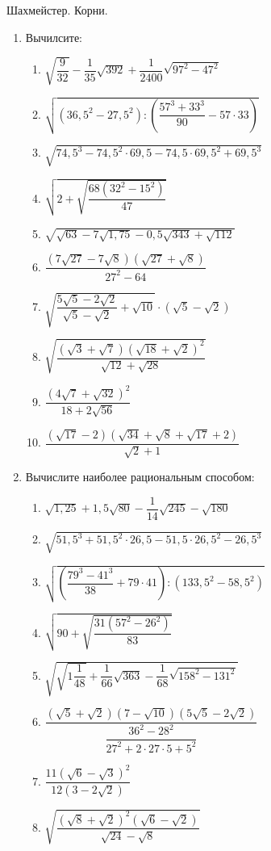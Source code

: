 \documentclass[12pt, a4paper]{article}
\begin{document}
	
	Шахмейстер. Корни.
\begin{enumerate}
	\item Вычилсите:
		\begin{enumerate}[label=\textbf{\arabic*)}]
			\item \( \sqrt{\dfrac{9}{32}}-\dfrac{1}{35}\sqrt{392}+\dfrac{1}{2400}\sqrt{97^2-47^2} \)
			\item \( \sqrt{(36,5^2-27,5^2):\left( \dfrac{57^3+33^3}{90}-57\cdot33 \right)} \) 
			\item \( \sqrt{74,5^3-74,5^2\cdot69,5-74,5\cdot69,5^2+69,5^3} \)
			\item \( \sqrt{2+\sqrt{\dfrac{68(32^2-15^2)}{47}}} \)
			\item \( \sqrt{\sqrt{63}-7\sqrt{1,75}-0,5\sqrt{343}+\sqrt{112}} \)
			\item \( \dfrac{(7\sqrt{27}-7\sqrt{8})(\sqrt{27}+\sqrt{8})}{27^2-64} \)
			\item \( \sqrt{\dfrac{5\sqrt{5}-2\sqrt{2}}{\sqrt{5}-\sqrt{2}}+\sqrt{10}}\cdot(\sqrt{5}-\sqrt{2}) \)
			\item \( \sqrt{\dfrac{(\sqrt{3}+\sqrt{7})(\sqrt{18}+\sqrt{2})^2}{\sqrt{12}+\sqrt{28}}} \)
			\item \( \dfrac{(4\sqrt{7}+\sqrt{32})^2}{18+2\sqrt{56}} \)
			\item \( \dfrac{(\sqrt{17}-2)(\sqrt{34}+\sqrt{8}+\sqrt{17}+2)}{\sqrt{2}+1} \)
		\end{enumerate}
	\item Вычислите наиболее рациональным способом:
		\begin{enumerate}[label=\textbf{\arabic*)}]
			\item \( \sqrt{1,25}+1,5\sqrt{80}-\dfrac{1}{14}\sqrt{245}-\sqrt{180} \)
			\item \( \sqrt{51,5^3+51,5^2\cdot26,5-51,5\cdot26,5^2-26,5^3} \)
			\item \( \sqrt{\left( \dfrac{79^3-41^3}{38}+79\cdot41 \right):(133,5^2-58,5^2)} \)
			\item \( \sqrt{90+\sqrt{\dfrac{31(57^2-26^2)}{83}}} \)
			\item \( \sqrt{\sqrt{1\dfrac{1}{48}}+\dfrac{1}{66}\sqrt{363}-\dfrac{1}{68}\sqrt{158^2-131^2}} \)
			\item \( \dfrac{(\sqrt{5}+\sqrt{2})(7-\sqrt{10})(5\sqrt{5}-2\sqrt{2})}{\dfrac{36^2-28^2}{27^2+2\cdot27\cdot5+5^2}} \)
			\item \( \dfrac{11(\sqrt{6}-\sqrt{3})^2}{12(3-2\sqrt{2})} \)
			\item \( \sqrt{\dfrac{(\sqrt{8}+\sqrt{2})^2(\sqrt{6}-\sqrt{2})}{\sqrt{24}-\sqrt{8}}} \)

\end{enumerate}
\end{enumerate}
\end{document}
